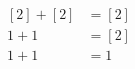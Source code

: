 \documentclass[preview]{standalone}
\begin{document}
\begin{align*}
\begin{aligned}[2] + [2] &= [2] \\1 + 1 &= [2] \\1 + 1 &= 1 \end{aligned}
\end{align*}
\end{document}
